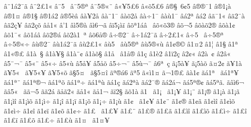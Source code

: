 {^^e2^^a81^^e12^^af^^e3
^^e2^^a82^^a31^^ab
^^e2^^a85^^a0
^^e2^^a85^^ae^^aa
^^e2^^a85^^ae^^ab^^a8
^^e2^^ab^^a55^^a36
^^e2^^ab^^f55^^a36
^^e2^^ae^^a7^^a06^^a25
^^e2^^ae^^ae^^af1
^^e2^^ae1^^a1^^e0
^^e2^^ae1^^a4
^^e2^^ae1^^a7
^^e2^^ae1^^e12
^^e2^^ae5^^e8^^e2
^^e2^^e0^^a52^^e5
^^e2^^e0^^a81^^af
^^e2^^e0^^f52^^e5
^^e2^^e0^^f71^^af
^^e2^^e0^^f91^^af
^^e2^^e12^^aa
^^e2^^e12^^ad
^^e2^^e3^^af1^^ab
^^e2^^e32^^af^^e0
^^e2^^e32^^e7^^a5
^^e2^^e32^^e7^^f5
^^e2^^e51^^ab
^^e2'1
^^e2^^ec5^^ae^^e0
^^e2^^ec6^^ac^^e3
^^e2^^ef5^^a1^^e0^^ef
^^e2^^f5^^aa1^^e1^^e2^^a0
^^e2^^f5^^ab^^f53^^ae
^^e2^^f5^^ac5^^ad
^^e2^^f5^^e0^^f52^^ae
^^e2^^f5^^e01^^a2
^^e2^^f51^^af^^ab
^^e2^^f51^^e1^^e2
^^e2^^f52^^ae^^e1
^^e2^^f52^^e01^^a0^^aa
^^e2^^f56^^e5^^ae
^^e2^^f7^^ae2^^af
^^e2^^f71^^e12^^af^^e3
^^e2^^f72^^a31^^ab
^^e2^^f75^^a0
^^e2^^f75^^ae^^aa
^^e2^^f75^^ae^^ab^^f7
^^e2^^f9^^ae2^^af
^^e2^^f91^^e12^^af^^e3
^^e2^^f92^^a31^^ab
^^e2^^f95^^a0
^^e2^^f95^^ae^^aa
^^e2^^f95^^ae^^ab^^f9
^^e21^^a2^^ae^^a9
^^e21^^a42
^^e21^^a6
^^e21^^a7
^^e21^^aa
^^e21^^ab^^ae^^a3
^^e21^^e0^^a0^^a7
^^e21^^e0^^a5^^a7
^^e21^^e0^^a8^^a2
^^e21^^e0^^f5^^a7
^^e21^^e5^^a0
^^e21^^e5^^ae
^^e21^^e7
^^e21^^e82
^^e21^^ef2^^e7
^^e22^^a2^^ab
^^e22^^e0^^a0^^a2
^^e22^^e2^^ab
^^e25^^a8^^ac^^af
^^e25^^ab^^a8^^ad
^^e25^^ab^^f7^^ad
^^e25^^ab^^f9^^ad
^^e25^^e5^^a5
^^e25^^e5^^f5
^^e25^^f7^^ac^^af
^^e25^^f9^^ac^^af
^^e26^^aa^^a0^^e7
^^e3^^a15^^e0^^a5
^^e3^^a15^^e0^^f5
^^e3^^a42^^a2
^^e3^^a51^^e0
^^e3^^a55^^ab^^a0
^^e3^^a55^^ab^^a5
^^e3^^a55^^ab^^f5
^^e3^^a75^^a4^^a0
^^e3^^a75^^a4^^ee
^^e3^^aa^^ae^^e16
^^e3^^aa5^^ad
^^e3^^ab^^ec1^^a4
^^e3^^ac1^^ad^^ae^^a3
^^e3^^e01^^a2
^^e3^^e11^^aa^^a0
^^e3^^e11^^aa^^a5
^^e3^^e11^^aa^^a8
^^e3^^e11^^aa^^ae^^ac
^^e3^^e11^^aa^^f5
^^e3^^e11^^aa^^f7
^^e3^^e11^^aa^^f9
^^e3^^e11^^e7
^^e3^^e12^^aa^^e0
^^e3^^e12^^af^^ae
^^e3^^e12^^e1^^ac
^^e3^^e15^^aa^^ae^^a2
^^e3^^e15^^aa^^e3.
^^e3^^e2^^ec6^^ac
^^e3^^e25^^ab^^a0
^^e3^^e3^^ac5
^^e3^^e32^^e1
^^e3^^e5^^e32^^ab
^^e3^^e51^^ab
^^e3^^e51^^ac
^^e3^^ef2^^a7
^^e3^^f51^^e0
^^e31^^a0
^^e31^^a1^^a0
^^e31^^a1^^a5
^^e31^^a1^^a8
^^e31^^a1^^ae
^^e31^^a1^^e0
^^e31^^a1^^e3
^^e31^^a1^^ec^^ee
^^e31^^a1^^ec^^f5
^^e31^^a1^^ec^^f7
^^e31^^a1^^ee
^^e31^^a1^^ef
^^e31^^a1^^f5
^^e31^^a1^^f7
^^e31^^a1^^f9
^^e31^^a2^^a0
^^e31^^a2^^a5
^^e31^^a2^^a8
^^e31^^a2^^ae
^^e31^^a2^^e3
^^e31^^a2^^ec^^ee
^^e31^^a2^^ec^^f5
^^e31^^a2^^ec^^f7
^^e31^^a2^^ee
^^e31^^a2^^ef
^^e31^^a2^^f5
^^e31^^a2^^f7
^^e31^^a3^^a0
^^e31^^a3^^a5
^^e31^^a3^^a8
^^e31^^a3^^ae
^^e31^^a3^^e3
^^e31^^a3^^ec^^ee
^^e31^^a3^^ec^^f5
^^e31^^a3^^ec^^f7
^^e31^^a3^^ee
^^e31^^a3^^ef
^^e31^^a3^^f5
^^e31^^a3^^f7
^^e31^^a3^^f9
^^e31^^a4^^a0
^^e31^^a4^^a5
}
